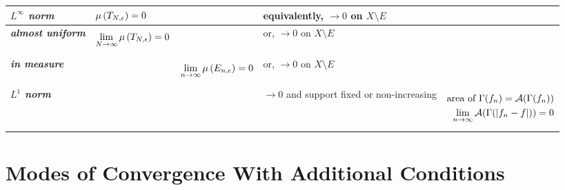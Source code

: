 \documentclass[11pt]{article}
\begin{document}
\begin{table}[h!]
\begin{tabularx}{1\textwidth} { 
  | >{\raggedright\arraybackslash} m{2cm}
  | >{\centering\arraybackslash}X
  | >{\centering\arraybackslash}X
  | >{\centering\arraybackslash}X
  | >{\centering\arraybackslash}X  | }
\hline
\emph{\textbf{$L^{\infty}$ norm}}  & $\mu\left(T_{N,\epsilon}\right) =0$ & & 
equivalently, $\rightarrow 0$ on $X \setminus E$  & \\
\hline
 \emph{\textbf{almost uniform}} & 
  \begin{align*}
 \lim\limits_{N \rightarrow \infty}\mu\left(T_{N,\epsilon}\right) = 0
\end{align*} 
 & & or, $\rightarrow 0$ on $X \setminus E$  &\\
 \hline
 \emph{\textbf{in measure}} & &
  \begin{align*}
 \lim\limits_{n \rightarrow \infty}\mu\left(E_{n,\epsilon}\right) = 0
\end{align*}  
  & or, $\rightarrow 0$ on $X \setminus E$ &\\
  \hline
\emph{\textbf{$L^{1}$ norm}} & & &
$\rightarrow 0$ and support fixed or non-increasing
 & 
  \begin{align*}
  \text{area of }\Gamma(f_n) = {\mathcal A}(\Gamma(f_n))\\
 \lim\limits_{n \rightarrow \infty}{\mathcal A}(\Gamma(\left\lvert f_n- f \right\rvert)) = 0
\end{align*} \\
\hline
\end{tabularx}
\end{table}

\newpage
\section{Modes of Convergence With Additional Conditions}
\end{document}
